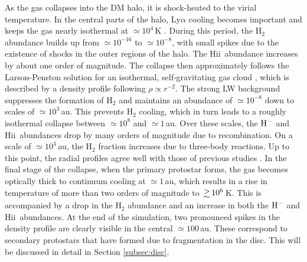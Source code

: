 \documentclass[useAMS,usenatbib]{mnras}
\newcommand{\HH}{\text{H}_2}          %
\newcommand{\HM}{{\rm H}^{-}}     %
\newcommand{\HII}{H{\sc ii}~}    %
\begin{document}
As the gas collapses into the DM halo, it is shock-heated to the virial temperature. In the central parts of the halo, Ly$\alpha$ cooling becomes important and keeps the gas nearly isothermal at $\simeq 10^4\,$K \citep{Wise_2007}. During this period, the $\HH$ abundance builds up from $\simeq 10^{-16}$ to $\simeq 10^{-8}$, with small spikes due to the existence of shocks in the outer regions of the halo. The \HII abundance increases by about one order of magnitude. The collapse then approximately follows the Larson-Penston solution for an isothermal, self-gravitating gas cloud \citep{Larson_69, Penston_69}, which is described by a density profile following $\rho \propto r^{-2}$. The strong LW background suppresses the formation of $\HH$ and maintains an abundance of $\simeq 10^{-8}$ down to scales of $\simeq 10^3\,$au. This prevents $\HH$ cooling, which in turn leads to a roughly isothermal collapse between $\simeq 10^8$ and $\simeq 1\,$au. Over these scales, the $\HM$ and \HII abundances drop by many orders of magnitude due to recombination. On a scale of $\simeq 10^3\,$au, the $\HH$ fraction increases due to three-body reactions. Up to this point, the radial profiles agree well with those of previous studies \citep{Wise_2008, Latif_2013a, Regan_2014a, Inayoshi_2014}. In the final stage of the collapse, when the primary protostar forms, the gas becomes optically thick to continuum cooling at $\simeq 1\,$au, which results in a rise in temperature of more than two orders of magnitude to $\ga 10^6\,$K. This is accompanied by a drop in the $\HH$ abundance and an increase in both the $\HM$ and \HII abundances. At the end of the simulation, two pronounced spikes in the density profile are clearly visible in the central $\simeq 100\,$au. These correspond to secondary protostars that have formed due to fragmentation in the disc. This will be discussed in detail in Section \ref{subsec:disc}.
        
\end{document}
